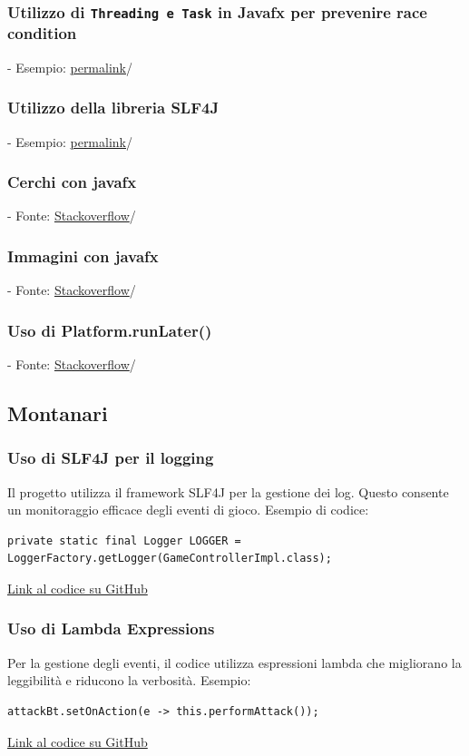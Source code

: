 \documentclass[a4paper,12pt]{report}
\begin{document}
\subsubsection{Utilizzo di \texttt{Threading e Task} in Javafx per prevenire race condition} - Esempio: \href{https://google.com}{permalink}/ 
\subsubsection{Utilizzo della libreria SLF4J} - Esempio: \href{https://google.com}{permalink}/ 
\subsubsection{Cerchi con javafx} - Fonte: \href{https://stackoverflow.com/questions/70876114/click-to-draw-a-shape-circle}{Stackoverflow}/ 
\subsubsection{Immagini con javafx} - Fonte: \href{https://stackoverflow.com/questions/52229984/javafx-imageview-actions}{Stackoverflow}/ 
\subsubsection{Uso di Platform.runLater()} - Fonte: \href{https://stackoverflow.com/questions/13784333/platform-runlater-and-task-in-javafx}{Stackoverflow}/ 

\subsection{Montanari}
\subsubsection{Uso di SLF4J per il logging}
Il progetto utilizza il framework SLF4J per la gestione dei log. Questo consente un monitoraggio efficace degli eventi di gioco.\newline
Esempio di codice:
\begin{verbatim}
private static final Logger LOGGER = LoggerFactory.getLogger(GameControllerImpl.class);
\end{verbatim}
\href{https://github.com/}{Link al codice su GitHub}

\subsubsection{Uso di Lambda Expressions}
Per la gestione degli eventi, il codice utilizza espressioni lambda che migliorano la leggibilità e riducono la verbosità.\newline
Esempio:
\begin{verbatim}
attackBt.setOnAction(e -> this.performAttack());
\end{verbatim}
\href{https://github.com/}{Link al codice su GitHub}
\end{document}
